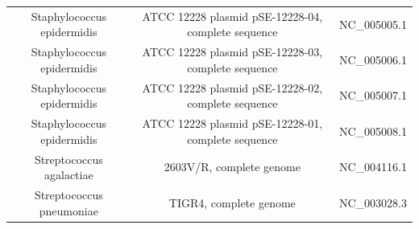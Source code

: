 \documentclass[10pt]{bmc_article}
\newenvironment{bmcformat}{\begin{raggedright}\baselineskip20pt\sloppy\setboolean{publ}{false}}{\end{raggedright}\baselineskip20pt\sloppy}
\begin{document}
\begin{bmcformat}
{\begin{tabular}{|c|c|c|}
        Staphylococcus epidermidis & ATCC 12228 plasmid pSE-12228-04, complete sequence &   NC\_005005.1 \\
        Staphylococcus epidermidis & ATCC 12228 plasmid pSE-12228-03, complete sequence &   NC\_005006.1 \\
        Staphylococcus epidermidis & ATCC 12228 plasmid pSE-12228-02, complete sequence &   NC\_005007.1 \\
        Staphylococcus epidermidis & ATCC 12228 plasmid pSE-12228-01, complete sequence &   NC\_005008.1 \\
        Streptococcus agalactiae & 2603V/R, complete genome & NC\_004116.1 \\
        Streptococcus pneumoniae & TIGR4, complete genome & NC\_003028.3 \\
	\hline
      \end{tabular}
      }

\end{bmcformat}
\end{document}
